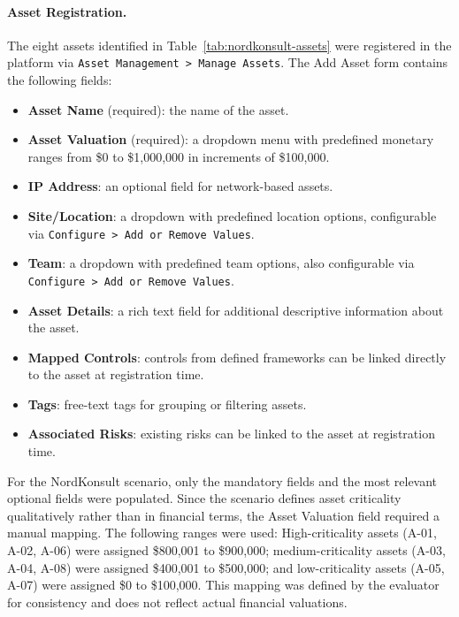 
\paragraph{Asset Registration.}
The eight assets identified in Table~\ref{tab:nordkonsult-assets} were registered in the
platform via \texttt{Asset Management > Manage Assets}. The Add Asset form contains the following fields:
 
\begin{itemize}
    \item \textbf{Asset Name} (required): the name of the asset.
    \item \textbf{Asset Valuation} (required): a dropdown menu with predefined monetary
          ranges from \$0 to \$1,000,000 in increments of \$100,000.
    \item \textbf{IP Address}: an optional field for network-based assets.
    \item \textbf{Site/Location}: a dropdown with predefined location options,
          configurable via \texttt{Configure > Add or Remove Values}.
    \item \textbf{Team}: a dropdown with predefined team options, also configurable
          via \texttt{Configure > Add or Remove Values}.
    \item \textbf{Asset Details}: a rich text field for additional descriptive
          information about the asset.
    \item \textbf{Mapped Controls}: controls from defined frameworks can be linked
          directly to the asset at registration time.
    \item \textbf{Tags}: free-text tags for grouping or filtering assets.
    \item \textbf{Associated Risks}: existing risks can be linked to the asset
          at registration time.
\end{itemize}
 
For the NordKonsult scenario, only the mandatory fields and the most relevant optional
fields were populated. Since the scenario defines asset criticality qualitatively rather
than in financial terms, the Asset Valuation field required a manual mapping. The
following ranges were used: High-criticality assets (A-01, A-02, A-06) were assigned
\$800,001 to \$900,000; medium-criticality assets (A-03, A-04, A-08) were assigned
\$400,001 to \$500,000; and low-criticality assets (A-05, A-07) were assigned
\$0 to \$100,000. This mapping was defined by the evaluator for consistency and does
not reflect actual financial valuations.
 
